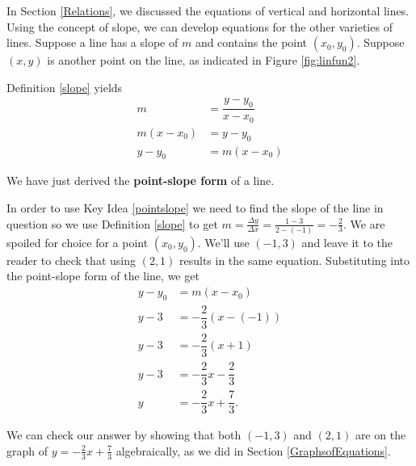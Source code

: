 \smallskip

In Section \ref{Relations}, we discussed the equations of vertical and horizontal lines.  Using the concept of slope, we can develop equations for the other varieties of lines.  Suppose a line has a slope of $m$ and contains the point $\left(x_{0}, y_{0}\right)$.  Suppose $(x,y)$ is another point on the line, as indicated in Figure \ref{fig:linfun2}.


\pagebreak

Definition \ref{slope} yields
\begin{align*} 
	m & = \dfrac{y - y_{0}}{x-x_{0}} \\
	m\left(x - x_{0}\right) & =  y - y_{0} \\
	y - y_{0} & = m\left(x - x_{0}\right)
\end{align*}

We have just derived the \textbf{point-slope form} of a line.


\smallskip


\medskip

{
In order to use Key Idea \ref{pointslope} we need to find the slope of the line in question so we use Definition \ref{slope} to get $m = \frac{\Delta y}{\Delta x} = \frac{1 - 3}{2 - (-1)} = -\frac{2}{3}$.  We are spoiled for choice for a point $\left(x_{0}, y_{0}\right)$. We'll use $(-1,3)$ and leave it to the reader to check that using $(2,1)$ results in the same equation.  Substituting into the point-slope form of the line, we get 
\begin{align*}
	y - y_{0} & = m\left(x - x_{0}\right)\\
	y - 3 & =  -\dfrac{2}{3} \left(x - (-1)\right)\\[2pt]
	y - 3 & =  -\dfrac{2}{3} \left(x +1 \right)\\[2pt]
	y - 3 & =  -\dfrac{2}{3}x - \dfrac{2}{3}\\[2pt]
	y     & =  -\dfrac{2}{3} x + \dfrac{7}{3}. 
\end{align*}



We can check our answer by showing that both $(-1,3)$ and $(2,1)$ are on the graph of $y  =  -\frac{2}{3} x + \frac{7}{3}$ algebraically, as we did in Section \ref{GraphsofEquations}.
}

